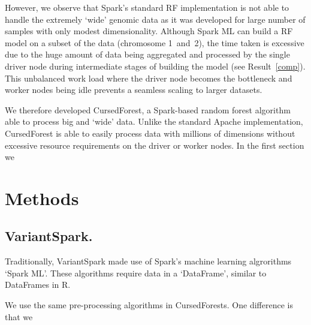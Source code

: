 \documentclass[10pt,letterpaper]{article}
\begin{document}
However, we observe that Spark's standard RF implementation is not able to handle the extremely `wide' genomic data as
it was developed for large number of samples with only modest dimensionality.  Although Spark ML can build a RF model on
a subset of the data (chromosome 1~and~2), the time taken is excessive due to the huge amount of data being aggregated
and processed by the single driver node during intermediate stages of building the model (see Result~\ref{comp}).  This
unbalanced work load where the driver node becomes the bottleneck and worker nodes being idle prevents a seamless
scaling to larger datasets.


We therefore developed CursedForest, a Spark-based random forest algorithm able to process big and `wide' data. Unlike
the standard Apache implementation, CursedForest is able to easily process data with millions of dimensions without
excessive resource requirements on the driver or worker nodes.
In the first section we 


\section*{Methods}




\subsection*{VariantSpark.}
Traditionally, VariantSpark made use of Spark's machine learning algrorithms `Spark ML'. These algorithms require data in a `DataFrame',
similar to DataFrames in R.

We use the same pre-processing algorithms in CursedForests. One difference is that we 
\end{document}
